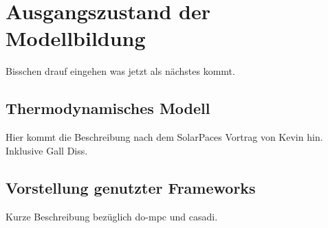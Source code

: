 \chapter{Ausgangszustand der Modellbildung} \label{ch_Ausgangszustand}
Bisschen drauf eingehen was jetzt als nächstes kommt.

\section{Thermodynamisches Modell} \label{sec_ThermodynamischesModell}
Hier kommt die Beschreibung nach dem SolarPaces Vortrag von Kevin hin.
Inklusive Gall Diss.


\section{Vorstellung genutzter Frameworks} \label{sec_Frameworks}
Kurze Beschreibung bezüglich do-mpc und casadi.